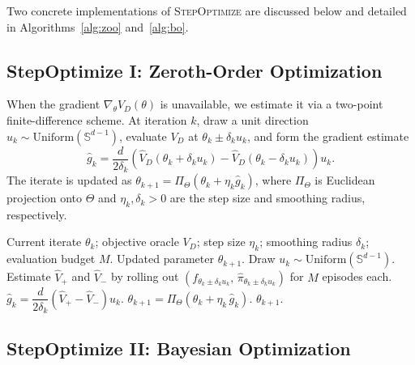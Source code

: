 \documentclass[12pt]{article}
\renewcommand{\[}{\left[}
\renewcommand{\]}{\right]}
\renewcommand{\(}{\left(}
\renewcommand{\)}{\right)}
\newcounter{l1}
\newcounter{l2}
\newcounter{l3}
\renewcommand{\hat}{\widehat}
\begin{document}
Two concrete implementations of \textsc{StepOptimize} are discussed below and
detailed in Algorithms~\ref{alg:zoo} and~\ref{alg:bo}.

\subsection{StepOptimize I: Zeroth-Order Optimization}
\label{sec:zoo}

When the gradient $\nabla_\theta V_D(\theta)$ is unavailable, we estimate it via a
two-point finite-difference scheme. At iteration $k$, draw a unit direction
$u_k \sim \mathrm{Uniform}(\mathbb{S}^{d-1})$, evaluate $V_D$ at $\theta_k \pm \delta_k u_k$,
and form the gradient estimate
\begin{equation}\label{eq:zo_grad}
  \hat{g}_k
  = \frac{d}{2\delta_k}\left(\widehat{V}_D(\theta_k + \delta_k u_k)
          - \widehat{V}_D(\theta_k - \delta_k u_k)\right)u_k.
\end{equation}
The iterate is updated as
$\theta_{k+1} = \Pi_\Theta(\theta_k + \eta_k \hat{g}_k)$,
where $\Pi_\Theta$ is Euclidean projection onto $\Theta$ and $\eta_k, \delta_k > 0$
are the step size and smoothing radius, respectively.

\begin{algorithm}[t]
\caption{\textsc{StepOptimize} via Zeroth-Order Optimization (ZOO)}
\label{alg:zoo}
\begin{algorithmic}[1]
\Require Current iterate $\theta_k$; objective oracle $V_D$; step size $\eta_k$;
  smoothing radius $\delta_k$; evaluation budget $M$.
\Ensure Updated parameter $\theta_{k+1}$.
\State Draw $u_k \sim \mathrm{Uniform}(\mathbb{S}^{d-1})$.
\State Estimate $\widehat{V}_+$ and $\widehat{V}_-$ by rolling out
  $(f_{\theta_k \pm \delta_k u_k},\, \widehat\pi_{\theta_k \pm \delta_k u_k})$
  for $M$ episodes each.
\State $\hat{g}_k = \dfrac{d}{2\delta_k}\left(\widehat{V}_+ - \widehat{V}_-\right)u_k$.
\State $\theta_{k+1} = \Pi_\Theta\!\left(\theta_k + \eta_k\, \hat{g}_k\right)$.
\State \Return $\theta_{k+1}$.
\end{algorithmic}
\end{algorithm}

\subsection{StepOptimize II: Bayesian Optimization}
\label{sec:bo}
\end{document}
